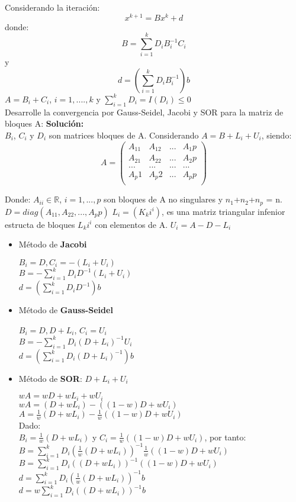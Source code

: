 Considerando la iteración:
$$x^{k+1}=Bx^{k}+d$$
donde: 
$$B=\sum_{i=1}^{k}D_{i}B_{i}^{-1}C_{i}$$ y $$d = (\sum_{i=1}^{k}D_{i}B_{i}^{-1})b$$
$A=B_{i}+C_{i}$, $i=1,....,k$ y $\sum_{i=1}^{k}D_i=I(D_i)\leq 0$\\

Desarrolle la convergencia por Gauss-Seidel, Jacobi y SOR para la matriz de bloques A:
\textbf{Solución:}\\

    $B_i$, $C_i$ y $D_i$ son matrices bloques de A. Considerando $A=B+L_i+U_i$, siendo:
    \[
        A = \left( \begin{array}{cccc}
        A_11 & A_12 & ... & A_1p \\ 
        A_21 & A_22 & ... & A_2p \\ 
        ... & ... & ... & ... \\ 
        A_p1 & A_p2 & ... & A_pp \\ 
        \end{array} \right)
    \]
    
Donde:
$A_{ii} \in \mathbb{R}$, $i=1,...,p$ son bloques de A no singulares y $n_1$+$n_2$+$n_p$ = n.\\
$D=diag(A_11,A_22,...,A_pp)$
$L_i=(K_ki^i)$, es una matriz triangular infenior estructa de bloques $L_ki^i$ con elementos de A.
$U_i = A-D-L_i$\\

\begin{itemize}
    \item Método de \textbf{Jacobi}
    
        $B_{i}=D, C_{i}=-(L_{i}+U_{i})$\\
        $B=-\sum_{i=1}^{k}D_{i}D^{-1}(L_{i}+U_{i})$\\
        $d=(\sum_{i=1}^{k}D_{i}D^{-1})b$
    
    \item Método de \textbf{Gauss-Seidel}
        
        $B_{i}=D, D+L_{i}$, $C_{i} = U_i$\\
        $B=-\sum_{i=1}^{k}D_{i}(D+L_{i})^{-1}U_{i}$\\
        $d=(\sum_{i=1}^{k}D_{i}(D+L_i)^{-1})b$
        
    \item Método de \textbf{SOR}: $D+L_i+U_i$
    
        $wA = wD+wL_i+wU_i$\\
        $wA = (D+wL_i)-((1-w)D+wU_i)$\\
        $A=\frac{1}{w}(D+wL_i)-\frac{1}{w}((1-w)D+wU_i)$\\
        Dado:\\
        $B_i=\frac{1}{w}(D+wL_i)$ y $C_i=\frac{1}{w}((1-w)D+wU_i)$, por tanto:\\
        $B=\sum_{i=1}^{k}D_{i}(\frac{1}{w}(D+wL_i))^{-1}\frac{1}{w}((1-w)D+wU_i)$\\
        $B=\sum_{i=1}^{k}D_{i}((D+wL_i))^{-1}((1-w)D+wU_i)$\\
        
        $d=\sum_{i=1}^{k}D_{i}(\frac{1}{w}(D+wL_i))^{-1}b$\\
        $d=w\sum_{i=1}^{k}D_{i}((D+wL_i))^{-1}b$
    
\end{itemize}